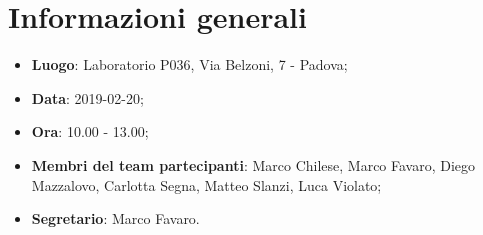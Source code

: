 \section{Informazioni generali}
\begin{itemize}
	\item \textbf{Luogo}: Laboratorio P036, Via Belzoni, 7 - Padova;
	\item \textbf{Data}: 2019-02-20;
	\item \textbf{Ora}: 10.00 - 13.00;
	\item \textbf{Membri del team partecipanti}: Marco Chilese, Marco Favaro, Diego Mazzalovo, Carlotta Segna, Matteo Slanzi, Luca Violato;
	\item \textbf{Segretario}: Marco Favaro. 
\end{itemize}
